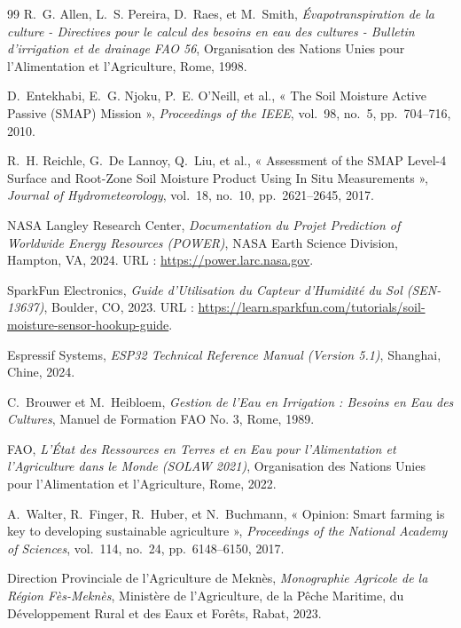 \documentclass[11pt,a4paper,oneside]{report}
\begin{document}
\begin{thebibliography}{99}
R.~G. Allen, L.~S. Pereira, D.~Raes, et M.~Smith, 
\emph{Évapotranspiration de la culture - Directives pour le calcul des besoins en eau des cultures - Bulletin d'irrigation et de drainage FAO 56}, 
Organisation des Nations Unies pour l'Alimentation et l'Agriculture, Rome, 1998.

D.~Entekhabi, E.~G. Njoku, P.~E. O'Neill, et al., 
« The Soil Moisture Active Passive (SMAP) Mission », 
\emph{Proceedings of the IEEE}, vol.~98, no.~5, pp.~704--716, 2010.

R.~H. Reichle, G.~De Lannoy, Q.~Liu, et al., 
« Assessment of the SMAP Level-4 Surface and Root-Zone Soil Moisture Product Using In Situ Measurements », 
\emph{Journal of Hydrometeorology}, vol.~18, no.~10, pp.~2621--2645, 2017.

NASA Langley Research Center, 
\emph{Documentation du Projet Prediction of Worldwide Energy Resources (POWER)}, 
NASA Earth Science Division, Hampton, VA, 2024. URL : \url{https://power.larc.nasa.gov}.

SparkFun Electronics, 
\emph{Guide d'Utilisation du Capteur d'Humidité du Sol (SEN-13637)}, 
Boulder, CO, 2023. URL : \url{https://learn.sparkfun.com/tutorials/soil-moisture-sensor-hookup-guide}.

Espressif Systems, 
\emph{ESP32 Technical Reference Manual (Version 5.1)}, 
Shanghai, Chine, 2024.

C.~Brouwer et M.~Heibloem, 
\emph{Gestion de l'Eau en Irrigation : Besoins en Eau des Cultures}, 
Manuel de Formation FAO No. 3, Rome, 1989.

FAO, 
\emph{L'État des Ressources en Terres et en Eau pour l'Alimentation et l'Agriculture dans le Monde (SOLAW 2021)}, 
Organisation des Nations Unies pour l'Alimentation et l'Agriculture, Rome, 2022.

A.~Walter, R.~Finger, R.~Huber, et N.~Buchmann, 
« Opinion: Smart farming is key to developing sustainable agriculture », 
\emph{Proceedings of the National Academy of Sciences}, vol.~114, no.~24, pp.~6148--6150, 2017.

Direction Provinciale de l'Agriculture de Meknès, 
\emph{Monographie Agricole de la Région Fès-Meknès}, 
Ministère de l'Agriculture, de la Pêche Maritime, du Développement Rural et des Eaux et Forêts, Rabat, 2023.
\end{thebibliography}
\end{document}
